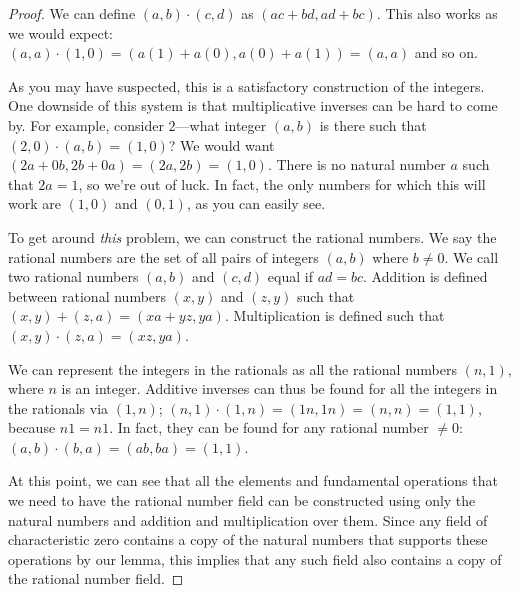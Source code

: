 \documentclass[12pt]{article}
\begin{document}
\begin{enumerate}
\begin{thm}
\begin{proof}
        We can define $(a,b) \cdot (c,d)$ as $(ac + bd, ad +
        bc)$. This also works as we would expect: $(a,a) \cdot
        (1,0) = (a(1) + a(0), a(0) + a(1)) = (a,a)$ and so on.

        As you may have suspected, this is a satisfactory
        construction of the integers. One downside of this
        system is that multiplicative inverses can be hard to
        come by. For example, consider $2$—what integer $(a,b)$
        is there such that $(2,0) \cdot (a,b) = (1,0)$? We would
        want $(2a + 0b, 2b + 0a) = (2a,2b) = (1,0)$. There is no
        natural number $a$ such that $2a = 1$, so we're out of
        luck. In fact, the only numbers for which this will work
        are $(1,0)$ and $(0,1)$, as you can easily see.

        To get around \textit{this} problem, we can construct the
        rational numbers. We say the rational numbers are the set
        of all pairs of integers $(a,b)$ where $b \neq 0$. We
        call two rational numbers $(a,b)$ and $(c,d)$ equal if
        $ad = bc$. Addition is defined between rational numbers
        $(x,y)$ and $(z,y)$ such that $(x,y) + (z,a) = (xa + yz,
        ya)$.  Multiplication is defined such that $(x,y) \cdot
        (z,a) = (xz,ya)$.

        We can represent the integers in the rationals as all the
        rational numbers $(n,1)$, where $n$ is an integer.
        Additive inverses can thus be found for all the integers
        in the rationals via $(1,n)$; $(n,1) \cdot (1,n) =
        (1n,1n) = (n,n) = (1,1)$, because $n1 = n1$. In fact,
        they can be found for any rational number $\neq 0$:
        $(a,b) \cdot (b,a) = (ab,ba) = (1,1)$.

        At this point, we can see that all the elements and
        fundamental operations that we need to have the rational
        number field can be constructed using only the natural
        numbers and addition and multiplication over them. Since
        any field of characteristic zero contains a copy of the
        natural numbers that supports these operations by our
        lemma, this implies that any such field also contains a
        copy of the rational number field.
      \end{proof}
    \end{thm}
\end{enumerate}
\end{document}
